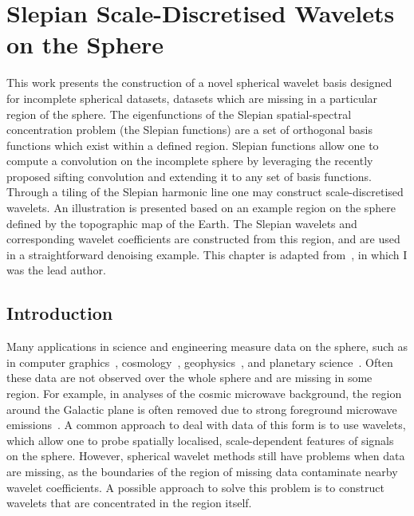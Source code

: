 \chapter{Slepian Scale-Discretised Wavelets on the Sphere}\label{sec:chapter4}

This work presents the construction of a novel spherical wavelet basis designed for incomplete spherical datasets, \ie{} datasets which are missing in a particular region of the sphere.
The eigenfunctions of the Slepian spatial-spectral concentration problem (the Slepian functions) are a set of orthogonal basis functions which exist within a defined region.
Slepian functions allow one to compute a convolution on the incomplete sphere by leveraging the recently proposed sifting convolution and extending it to any set of basis functions.
Through a tiling of the Slepian harmonic line one may construct scale-discretised wavelets.
An illustration is presented based on an example region on the sphere defined by the topographic map of the Earth.
The Slepian wavelets and corresponding wavelet coefficients are constructed from this region, and are used in a straightforward denoising example.
This chapter is adapted from~\autocite{Roddy2021a}, in which I was the lead author.

\section{Introduction}

Many applications in science and engineering measure data on the sphere, such as in computer graphics~\autocite{Ramamoorthi2004}, cosmology~\autocite{Bennett1996}, geophysics~\autocite{Simons2006}, and planetary science~\autocite{Turcotte1981}.
Often these data are not observed over the whole sphere and are missing in some region.
For example, in analyses of the cosmic microwave background, the region around the Galactic plane is often removed due to strong foreground microwave emissions~\autocite{Mortlock2002}.
A common approach to deal with data of this form is to use wavelets, which allow one to probe spatially localised, scale-dependent features of signals on the sphere.
However, spherical wavelet methods still have problems when data are missing, as the boundaries of the region of missing data contaminate nearby wavelet coefficients.
A possible approach to solve this problem is to construct wavelets that are concentrated in the region itself.

